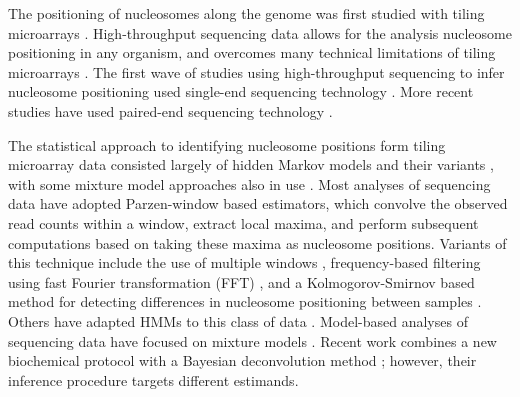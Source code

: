 %
The positioning of nucleosomes along the genome was first studied with tiling microarrays \citep{Yuan2005,sega:fond:chen:thas:2006,Lee2007}.
%
High-throughput sequencing data allows for the analysis nucleosome positioning in any organism,
and overcomes many technical limitations of  tiling microarrays
\citep{Jansen2011}.
%
The first wave of studies using high-throughput sequencing to infer nucleosome positioning used single-end sequencing technology \citep{Albert2007a,Shivaswamy2008,Tsankov2010}.
More recent studies have used paired-end sequencing technology \citep{Gkikopoulos2011}.

The statistical approach to identifying nucleosome positions form tiling microarray data consisted largely of hidden Markov models and their variants \citep{Gupta2007,Yuan2008,yass:kapl:jaim:frie:2008,Sun2009a,Mitra2011}, with some mixture model approaches also in use \citep{Sun2009b}.
%
Most analyses of sequencing data have adopted Parzen-window based estimators, which convolve the observed read counts within a window,
extract local maxima, and perform subsequent computations based on taking these maxima as nucleosome positions.
Variants of this technique include the use of multiple windows \citep{Weiner2010}, frequency-based filtering using fast Fourier transformation (FFT) \citep{Flores2011}, and a Kolmogorov-Smirnov based method for detecting differences in nucleosome positioning between samples \citep{Fu2012}.
Others have adapted HMMs to this class of data \citep{Cairns2011}.
%
Model-based analyses of sequencing data have focused on mixture models \citep{Polishko2012,Rashid2011,Zhang2012}.
Recent work combines a new biochemical protocol with a Bayesian deconvolution method \citep{Brogaard2012}; however, their inference procedure targets different estimands.

